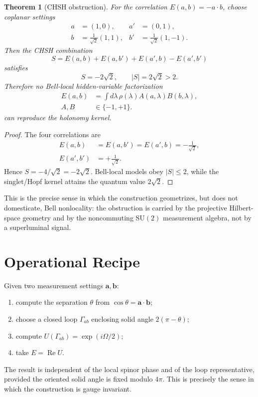\documentclass[
  aps,
  pra,
  reprint,
  superscriptaddress,
  nofootinbib,
  longbibliography,
  floatfix,
  amsmath,
  amssymb
]{revtex4-2}
\theoremstyle{plain}
\newtheorem{theorem}{Theorem}
\theoremstyle{definition}
\theoremstyle{remark}
\newcommand{\SU}{\mathrm{SU}}
\begin{document}
\begin{theorem}[CHSH obstruction]
For the correlation $E(a,b)=-a\cdot b$, choose coplanar settings
\begin{align}
 a&=(1,0), & a'&=(0,1),\\
 b&=\frac{1}{\sqrt2}(1,1), &
 b'&=\frac{1}{\sqrt2}(1,-1).
\end{align}
Then the CHSH combination
\begin{equation}
 S=E(a,b)+E(a,b')+E(a',b)-E(a',b')
\end{equation}
satisfies
\begin{equation}
   S=-2\sqrt2,
   \qquad |S|=2\sqrt2>2 .
\end{equation}
Therefore no Bell-local hidden-variable factorization
\begin{equation}
\begin{split}
   E(a,b)&=\int d\lambda\,\rho(\lambda)
   A(a,\lambda)B(b,\lambda),\\
   A,B&\in\{-1,+1\}.
\end{split}
\end{equation}
can reproduce the holonomy kernel.
\end{theorem}

\begin{proof}
The four correlations are
\begin{align}
E(a,b)&=E(a,b')=E(a',b)=-\frac{1}{\sqrt2},\\
E(a',b')&=+\frac{1}{\sqrt2}.
\end{align}
Hence $S=-4/\sqrt2=-2\sqrt2$. Bell-local models obey $|S|\leq2$, while the singlet/Hopf kernel attains the quantum value $2\sqrt2$.
\end{proof}

This is the precise sense in which the construction geometrizes, but does not domesticate, Bell nonlocality: the obstruction is carried by the projective Hilbert-space geometry and by the noncommuting $\SU(2)$ measurement algebra, not by a superluminal signal.

\section{Operational Recipe}
\label{sec:recipe}

Given two measurement settings \(\bm a,\bm b\):
\begin{enumerate}
\item compute the separation \(\theta\) from \(\cos\theta=\bm a\cdot\bm b\);
\item choose a closed loop \(\Gamma_{ab}\) enclosing solid angle \(2(\pi-\theta)\);
\item compute \(U(\Gamma_{ab})=\exp(i\Omega/2)\);
\item take \(E=\operatorname{Re}U\).
\end{enumerate}
The result is independent of the local spinor phase and of the loop representative, provided the oriented solid angle is fixed modulo \(4\pi\).  This is precisely the sense in which the construction is gauge invariant.
\end{document}
